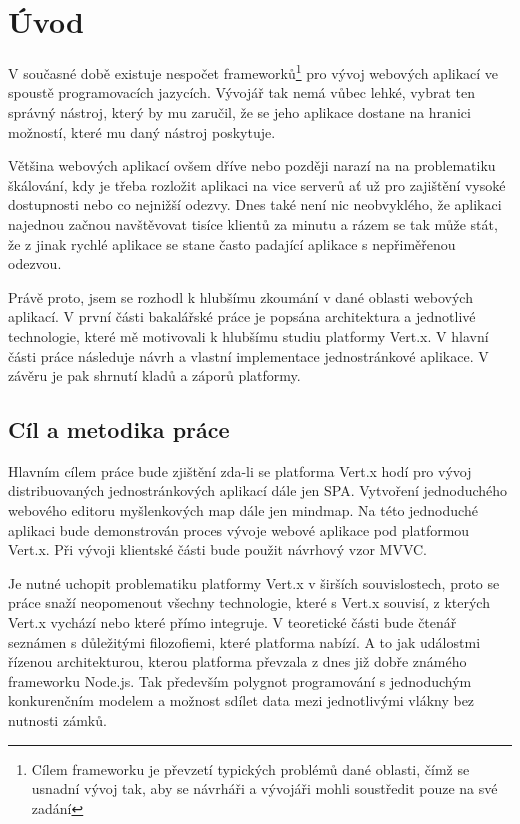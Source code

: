

\chapter{Úvod}

V současné době existuje nespočet frameworků\footnote{Cílem frameworku je převzetí typických problémů dané oblasti, čímž se usnadní vývoj tak, aby se návrháři a vývojáři mohli soustředit pouze na své zadání} pro vývoj webových aplikací ve spoustě programovacích jazycích. Vývojář tak nemá vůbec lehké, vybrat ten správný nástroj, který by mu zaručil, že se jeho aplikace dostane na hranici možností, které mu daný nástroj poskytuje. 

Většina webových aplikací ovšem dříve nebo později narazí na na problematiku škálování, kdy je třeba rozložit aplikaci na vice serverů ať už pro zajištění vysoké dostupnosti nebo co nejnižší odezvy. Dnes také není nic neobvyklého, že aplikaci najednou začnou navštěvovat tisíce klientů za minutu a rázem se tak může stát, že z jinak rychlé aplikace se stane často padající aplikace s nepřiměřenou odezvou.

Právě proto, jsem se rozhodl k hlubšímu zkoumání v dané oblasti webových aplikací. V první části bakalářské práce je popsána architektura a jednotlivé technologie, které mě motivovali k hlubšímu studiu platformy Vert.x. V hlavní části práce následuje návrh a vlastní implementace jednostránkové aplikace. V závěru je pak shrnutí kladů a záporů platformy. 

\section{Cíl a metodika práce}

Hlavním cílem práce bude zjištění zda-li se  platforma Vert.x hodí pro vývoj distribuovaných jednostránkových aplikací dále jen SPA. Vytvoření jednoduchého webového editoru myšlenkových map dále jen mindmap. %
Na této jednoduché aplikaci bude demonstrován proces vývoje webové aplikace pod platformou Vert.x. Při vývoji klientské části bude použit návrhový vzor MVVC.

Je nutné uchopit problematiku platformy Vert.x v širších souvislostech, proto se práce snaží neopomenout všechny technologie, které s Vert.x souvisí, z kterých Vert.x vychází nebo které přímo integruje. V teoretické části bude čtenář seznámen s důležitými filozofiemi, které platforma nabízí. A to jak událostmi řízenou architekturou, kterou platforma převzala z dnes již dobře známého frameworku Node.js. Tak především polygnot programování s jednoduchým konkurenčním modelem a možnost sdílet data mezi jednotlivými vlákny bez nutnosti zámků.

